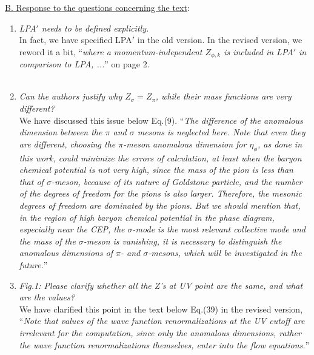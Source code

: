 \documentclass[aps,article,author-year,notitlepage,showpacs]{revtex4-1}
\begin{document}
\noindent \underline{B. Response to the questions concerning the text}:\\

\begin{enumerate}[1.]

\item {\it LPA$'$ needs to be defined explicitly. } \\
 
In fact, we have specified LPA$'$ in the old version. In the revised version, we reword it a bit, ``{\it where a momentum-independent $Z_{\phi,k}$ is included in LPA$'$ in comparison to LPA, ...}'' on page 2.\\[0.3ex] 

\item {\it Can the authors justify why $Z_{\sigma} = Z_{\pi}$, while their mass functions are very different?} \\

We have discussed this issue below Eq.(9). ``{\it The difference of the anomalous dimension between the $\pi$ and $\sigma$ mesons is neglected here. Note that even they are different, choosing the $\pi$-meson anomalous dimension for $\eta_\phi$, as done in this work, could minimize the errors of calculation, at least when the baryon chemical potential is not very high, since the mass of the pion is less than that of $\sigma$-meson, because of its nature of Goldstone particle, and the number of the degrees of freedom for the pions is also larger. Therefore, the mesonic degrees of freedom are dominated by the pions. But we should mention that, in the region of  high baryon chemical potential in the phase diagram, especially near the CEP, the $\sigma$-mode is the most relevant collective mode and the mass of the $\sigma$-meson is vanishing, it is necessary to distinguish the anomalous dimensions of $\pi$- and $\sigma$-mesons, which will be investigated in the future.}'' \\[0.3cm] 

\item {\it Fig.1: Please clarify whether all the Z's at UV point are the same, and what are the values?}\\

We have clarified this point in the text below Eq.(39) in the revised version, ``{\it Note that values of the wave function renormalizations at the UV cutoff are irrelevant for the computation, since only the anomalous dimensions, rather the wave function renormalizations themselves, enter into the flow equations.}'' \\[0.3cm] 


\end{enumerate}
\end{document}
